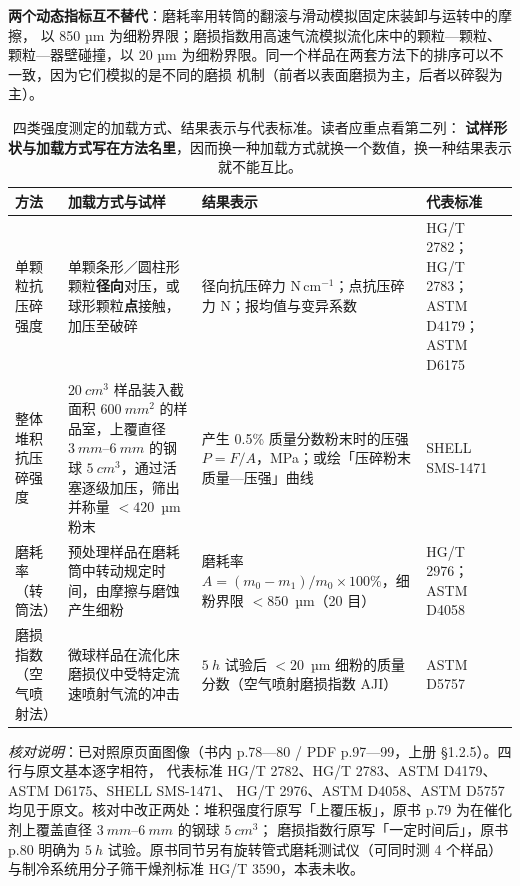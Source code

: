 \textbf{两个动态指标互不替代}：磨耗率用转筒的翻滚与滑动模拟固定床装卸与运转中的摩擦，
以 850 µm 为细粉界限；磨损指数用高速气流模拟流化床中的颗粒—颗粒、颗粒—器壁碰撞，以
20 µm 为细粉界限。同一个样品在两套方法下的排序可以不一致，因为它们模拟的是不同的磨损
机制（前者以表面磨损为主，后者以碎裂为主）。

\begin{table}[htbp]
\centering
\caption{四类强度测定的加载方式、结果表示与代表标准。读者应重点看第二列：
\textbf{试样形状与加载方式写在方法名里}，因而换一种加载方式就换一个数值，换一种结果表示
就不能互比。}
\label{tab:ch01c-strength}
{\srcsize
\begin{tabularx}{\columnwidth}{@{}lXXX@{}}
\toprule
方法 & 加载方式与试样 & 结果表示 & 代表标准 \\
\midrule
单颗粒抗压碎强度 & 单颗条形／圆柱形颗粒\textbf{径向}对压，或球形颗粒\textbf{点}接触，加压至破碎 & 径向抗压碎力 $\mathrm{N\,cm^{-1}}$；点抗压碎力 N；报均值与变异系数 & HG/T 2782；HG/T 2783；ASTM D4179；ASTM D6175 \\
整体堆积抗压碎强度 & $\qty{20}{cm^3}$ 样品装入截面积 $\qty{600}{mm^2}$ 的样品室，上覆直径 $\qty{3}{mm}$--$\qty{6}{mm}$ 的钢球 $\qty{5}{cm^3}$，通过活塞逐级加压，筛出并称量 $<420$~µm 粉末 & 产生 0.5\% 质量分数粉末时的压强 $P=F/A$，MPa；或绘「压碎粉末质量—压强」曲线 & SHELL SMS-1471 \\
磨耗率（转筒法） & 预处理样品在磨耗筒中转动规定时间，由摩擦与磨蚀产生细粉 & 磨耗率 $A=(m_0-m_1)/m_0\times100\%$，细粉界限 $<850$~µm（20 目） & HG/T 2976；ASTM D4058 \\
磨损指数（空气喷射法） & 微球样品在流化床磨损仪中受特定流速喷射气流的冲击 & $\qty{5}{h}$ 试验后 $<20$~µm 细粉的质量分数（空气喷射磨损指数 AJI） & ASTM D5757 \\
\bottomrule
\end{tabularx}}
\end{table}

\emph{核对说明}：已对照原页面图像（书内 p.78—80 / PDF p.97—99，上册 §1.2.5）。四行与原文基本逐字相符，
代表标准 HG/T 2782、HG/T 2783、ASTM D4179、ASTM D6175、SHELL SMS-1471、
HG/T 2976、ASTM D4058、ASTM D5757 均见于原文。核对中改正两处：堆积强度行原写「上覆压板」，原书 p.79 为在催化剂上覆盖直径 $\qty{3}{mm}$--$\qty{6}{mm}$ 的钢球 $\qty{5}{cm^3}$；
磨损指数行原写「一定时间后」，原书 p.80 明确为 $\qty{5}{h}$ 试验。原书同节另有旋转管式磨耗测试仪（可同时测
4 个样品）与制冷系统用分子筛干燥剂标准 HG/T 3590，本表未收。



